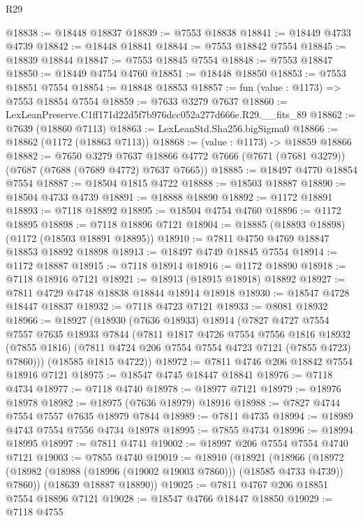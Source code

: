 \begin{lexlean}{R29}
\begin{coremodule}
@18838 := @18448 @18837
@18839 := @7553 @18838
@18841 := @18449 @4733 @4739
@18842 := @18448 @18841
@18844 := @7553 @18842 @7554
@18845 := @18839 @18844
@18847 := @7553 @18845 @7554
@18848 := @7553 @18847
@18850 := @18449 @4754 @4760
@18851 := @18448 @18850
@18853 := @7553 @18851 @7554
@18854 := @18848 @18853
@18857 := fun (value : @1173) => @7553 @18854 @7554
@18859 := @7633 @3279 @7637
@18860 := LexLeanPreserve.C1ff171d22d5f7b976dcc052a277d666e.R29.__fits_89
@18862 := @7639 (@18860 @7113)
@18863 := LexLeanStd.Sha256.bigSigma0
@18866 := @18862 (@1172 (@18863 @7113))
@18868 := (value : @1173) -> @18859 @18866
@18882 := @7650
    @3279
    @7637
    @18866
    @4772
    @7666
    (@7671 (@7681 @3279))
    (@7687 (@7688 (@7689 @4772) @7637 @7665))
@18885 := @18497 @4770 @18854 @7554
@18887 := @18504 @1815 @4722
@18888 := @18503 @18887
@18890 := @18504 @4733 @4739
@18891 := @18888 @18890
@18892 := @1172 @18891
@18893 := @7118 @18892
@18895 := @18504 @4754 @4760
@18896 := @1172 @18895
@18898 := @7118 @18896 @7121
@18904 := @18885 (@18893 @18898) (@1172 (@18503 @18891 @18895))
@18910 := @7811 @4750 @4769 @18847 @18853 @18892 @18898
@18913 := @18497 @4749 @18845 @7554
@18914 := @1172 @18887
@18915 := @7118 @18914
@18916 := @1172 @18890
@18918 := @7118 @18916 @7121
@18921 := @18913 (@18915 @18918) @18892
@18927 := @7811 @4729 @4748 @18838 @18844 @18914 @18918
@18930 := @18547 @4728 @18447 @18837
@18932 := @7118 @4723 @7121
@18933 := @8081 @18932
@18966 := @18927
    (@18930
      (@7636 @18933)
      @18914
      (@7827
        @4727
        @7554
        @7557
        @7635
        @18933
        @7844
        (@7811
          @1817
          @4726
          @7554
          @7556
          @1816
          @18932
          (@7855 @1816)
          (@7811 @4724 @206 @7554 @7554 @4723 @7121 (@7855 @4723) @7860)))
      (@18585 @1815 @4722))
@18972 := @7811 @4746 @206 @18842 @7554 @18916 @7121
@18975 := @18547 @4745 @18447 @18841
@18976 := @7118 @4734
@18977 := @7118 @4740
@18978 := @18977 @7121
@18979 := @18976 @18978
@18982 := @18975 (@7636 @18979) @18916
@18988 := @7827 @4744 @7554 @7557 @7635 @18979 @7844
@18989 := @7811 @4735
@18994 := @18989 @4743 @7554 @7556 @4734 @18978
@18995 := @7855 @4734
@18996 := @18994 @18995
@18997 := @7811 @4741
@19002 := @18997 @206 @7554 @7554 @4740 @7121
@19003 := @7855 @4740
@19019 := @18910
    (@18921
      (@18966 (@18972 (@18982 (@18988 (@18996 (@19002 @19003 @7860))) (@18585 @4733 @4739)) @7860))
      (@18639 @18887 @18890))
@19025 := @7811 @4767 @206 @18851 @7554 @18896 @7121
@19028 := @18547 @4766 @18447 @18850
@19029 := @7118 @4755

\end{coremodule}
\end{lexlean}
